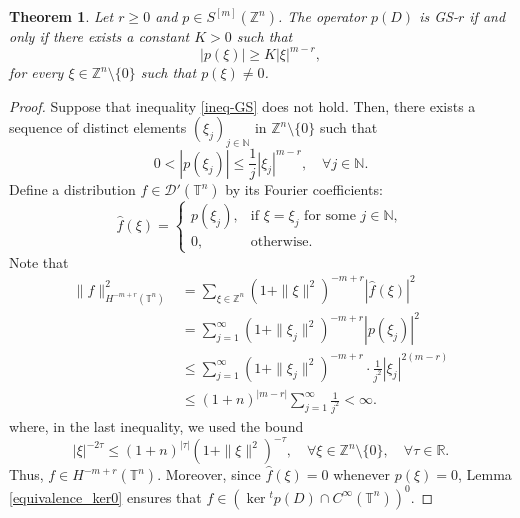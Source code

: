 \documentclass[11pt]{amsart}
\numberwithin{equation}{section}
\newtheorem{theorem}{Theorem}[section]
\theoremstyle{definition}
\begin{document}
	\begin{theorem}\label{theoGS}
		Let \( r \geq 0 \) and \( p \in S^{[m]}(\mathbb{Z}^n) \). The operator \( p(D) \) is GS-$r$ if and only if there exists a constant \( K > 0 \) such that
		\begin{equation}\label{ineq-GS}
			|p(\xi)|\geq K|\xi|^{m-r},
		\end{equation}
		for every \( \xi \in \mathbb{Z}^n \setminus \{0\} \) such that \( p(\xi) \neq 0 \).
	\end{theorem}
	
	\begin{proof}
		Suppose that inequality \eqref{ineq-GS} does not hold. Then, there exists a sequence of distinct elements \( (\xi_j)_{j \in \mathbb{N}} \) in \( \mathbb{Z}^n \setminus \{0\} \) such that
		\begin{equation}\label{ineq-GS-not}
			0 < |p(\xi_j)|\leq  \frac{1}{j}|\xi_j|^{m-r}, \quad  \forall j \in \mathbb{N}.
		\end{equation}	
		Define a distribution \( f \in \mathscr{D}'(\mathbb{T}^n) \) by its Fourier coefficients:
\[
		\widehat{f}(\xi) = 
		\begin{cases}
			p(\xi_j), & \text{if } \xi = \xi_j \text{ for some } j \in \mathbb{N}, \\
			0, & \text{otherwise}.
		\end{cases}
		\]
            Note that
		\begin{align*}
			\|f\|_{H^{-m + r}(\mathbb{T}^n)}^2 
			&= \sum_{\xi \in \mathbb{Z}^n} (1 + \|\xi\|^2)^{-m + r} |\widehat{f}(\xi)|^2 \\
			&= \sum_{j=1}^\infty (1 + \|\xi_j\|^2)^{-m + r} |p(\xi_j)|^2 \\
			&\leq \sum_{j=1}^\infty (1 + \|\xi_j\|^2)^{-m + r} \cdot \frac{1}{j^2} |\xi_j|^{2(m - r)} \\
			&\leq (1 + n)^{|m - r|} \sum_{j=1}^\infty \frac{1}{j^2} < \infty.
		\end{align*}
		where, in the last inequality, we used the bound  
	\begin{equation}\label{good-bound}
			|\xi|^{-2\tau} \leq (1+n)^{|\tau|} (1+\|\xi\|^2)^{-\tau}, \quad \forall \xi \in \mathbb{Z}^n \setminus \{0\}, \quad \forall \tau \in \mathbb{R}.
	\end{equation}
		Thus, \( f \in H^{-m + r}(\mathbb{T}^n) \). Moreover, since \( \widehat{f}(\xi) = 0 \) whenever \( p(\xi) = 0 \), Lemma \ref{equivalence_ker0} ensures that \( f \in (\ker {}^t p(D) \cap C^\infty(\mathbb{T}^n))^0 \).


\end{proof}
\end{document}
